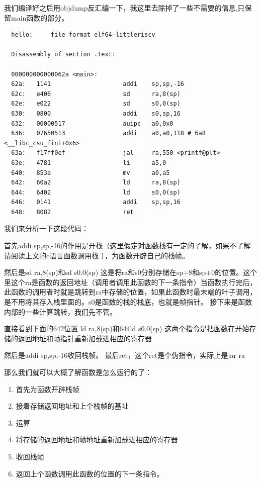 \documentclass[lang=cn,10pt]{elegantbook}
\begin{document}
我们编译好之后用objdump反汇编一下，我这里去除掉了一些不需要的信息,只保留main函数的部分。
\begin{lstlisting}
  hello:     file format elf64-littleriscv

  Disassembly of section .text:
  
  000000000000062a <main>:
  62a:   1141                    addi    sp,sp,-16
  62c:   e406                    sd      ra,8(sp)
  62e:   e022                    sd      s0,0(sp)
  630:   0800                    addi    s0,sp,16
  632:   00000517                auipc   a0,0x0
  636:   07650513                addi    a0,a0,118 # 6a8 <__libc_csu_fini+0x6>
  63a:   f17ff0ef                jal     ra,550 <printf@plt>
  63e:   4781                    li      a5,0
  640:   853e                    mv      a0,a5
  642:   60a2                    ld      ra,8(sp)
  644:   6402                    ld      s0,0(sp)
  646:   0141                    addi    sp,sp,16
  648:   8082                    ret
\end{lstlisting}

我们来分析一下这段代码：

首先addi sp,sp,-16的作用是开栈（这里假定对函数栈有一定的了解，如果不了解请阅读上文的c语言函数调用栈 ），为函数开辟自己的栈帧。

然后是sd ra,8(sp)和sd s0,0(sp) 这是将ra和s0分别存储在sp+8和sp+0的位置。这个里这个ra是函数的返回地址（调用者调用此函数的下一条指令）当函数执行完后，此函数的调用者时就是跳转到ra中存储的位置，如果此函数时最末端的叶子调用，是不用将其存入栈里面的。s0是函数的栈的栈底，也就是帧指针。
接下来是函数内部的一些计算跳转，我们先不管。

直接看到下面的642位置 ld ra,8(sp)和644ld s0.0(sp) 这两个指令是把函数在开始存储的返回地址和帧指针重新加载进相应的寄存器

然后是addi sp,sp,-16收回栈帧。 最后ret，这个ret是个伪指令，实际上是jar ra

那么我们就可以大概了解函数是怎么运行的了：
\begin{enumerate}
\item 首先为函数开辟栈帧
\item 接着存储返回地址和上个栈帧的基址
\item 运算
\item 将存储的返回地址和帧地址重新加载进相应的寄存器
\item 收回栈帧
\item 返回上个函数调用此函数的位置的下一条指令。
\end{enumerate}
\end{document}
